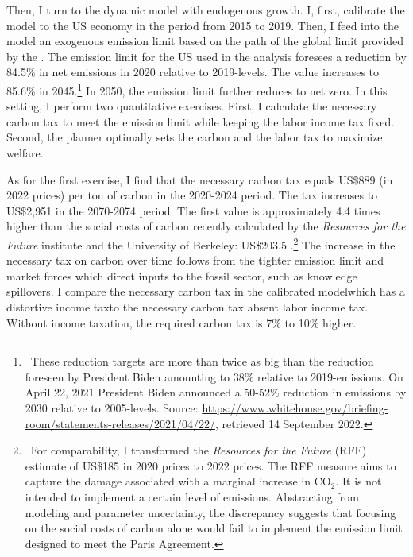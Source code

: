 Then, I turn to the dynamic model with endogenous growth. I, first, calibrate the model to the US economy in the period from 2015 to 2019. Then, I feed into the model an exogenous emission limit based on the path of the global limit provided by the \cite{IPCC2022}. The emission limit for the US used in the analysis foresees a reduction by 84.5\% in net emissions  in 2020 relative to 2019-levels. The value increases to 85.6\% in 2045.\footnote{\  These reduction targets are more than twice as big than the reduction foreseen by President Biden amounting to 38\% relative to 2019-emissions. On April 22, 2021 President Biden announced a 50-52\% reduction in emissions by 2030 relative to 2005-levels. Source:  \href{https://www.whitehouse.gov/briefing-room/statements-releases/2021/04/22/fact-sheet-president-biden-sets-2030-greenhouse-gas-pollution-reduction-target-aimed-at-creating-good-paying-union-jobs-and-securing-u-s-leadership-on-clean-energy-technologies/}{https://www.whitehouse.gov/briefing-room/statements-releases/2021/04/22/}, retrieved 14 September 2022.} In 2050, the emission limit further reduces to net zero.
 In this setting, I perform two quantitative exercises. First, I calculate the necessary carbon tax to meet the emission limit while keeping the labor income tax fixed. Second,  the planner optimally sets the carbon and the labor tax to maximize welfare.

As for the first exercise, I find that the necessary carbon tax equals US\$889 (in 2022 prices) per ton of carbon in the 2020-2024 period. The tax increases to US\$2,951 in the 2070-2074 period. The first value is approximately 4.4 times higher than the social costs of carbon recently calculated by the \textit{Resources for the Future} institute and the University of Berkeley: US\$203.5 \citep{Rennert2022ComprehensiveCO2}.\footnote{\  For comparability, I transformed the \textit{Resources for the Future} (RFF) estimate of US\$185 in 2020 prices to 2022 prices. The RFF measure aims to capture the damage associated with a marginal increase in CO$_2$. It is not intended to implement a certain level of emissions. Abstracting from modeling and parameter uncertainty, the discrepancy suggests that focusing on the social costs of carbon alone would fail to implement the emission limit designed to meet the Paris Agreement. } 
The  increase in the necessary tax on carbon over time follows from the tighter emission limit and market forces which direct inputs to the fossil sector, such as knowledge spillovers. I compare the necessary carbon tax in the calibrated model\textemdash which has a distortive income tax\textemdash to the necessary carbon tax absent labor income tax. Without income taxation, the required carbon tax is  7\% to 10\% higher.

